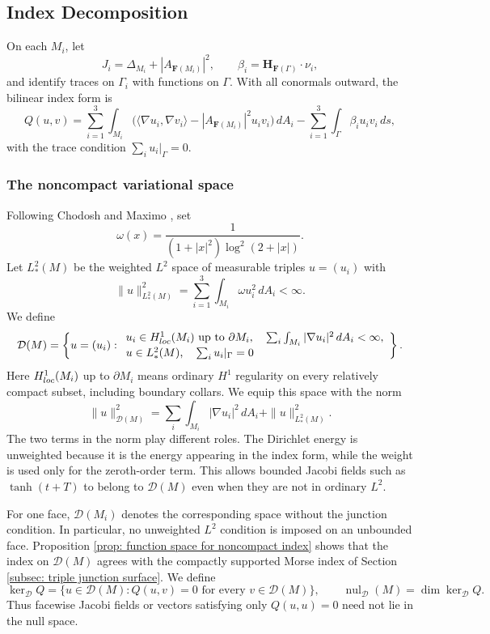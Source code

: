 \documentclass[11pt,twoside]{amsart}
\numberwithin{equation}{section}
\begin{document}
\subsection{Index Decomposition} \label{subsec: index decomp}
On each $M_i$, let
\[
J_i=\Delta_{M_i}+|A_{\mathbf F(M_i)}|^2,
\qquad
\beta_i=\mathbf H_{\mathbf F(\Gamma)}\cdot\nu_i,
\]
and identify traces on $\Gamma_i$ with functions on $\Gamma$. With all conormals outward, the bilinear index form is
\[
Q(u,v)=\sum_{i=1}^3\int_{M_i}
\bigl(\langle\nabla u_i,\nabla v_i\rangle-|A_{\mathbf F(M_i)}|^2u_iv_i\bigr)\,dA_i
-\sum_{i=1}^3\int_\Gamma\beta_i u_iv_i\,ds,
\]
with the trace condition $\sum_i u_i|_\Gamma=0$.

\subsubsection*{The noncompact variational space}
Following Chodosh and Maximo \cite[Section 3]{chodosh2018topology}, set
\[
\omega(x)=\frac{1}{(1+|x|^2)\log^2(2+|x|)}.
\]
Let $L_*^2(M)$ be the weighted $L^2$ space of measurable triples $u=(u_i)$ with
\[
\|u\|_{L_*^2(M)}^2=\sum_{i=1}^3\int_{M_i}\omega u_i^2\,dA_i<\infty.
\]
We define
\[
\mathcal D(M)=\left\{u=(u_i):
\begin{array}{l}
u_i\in H^1_{\rm loc}(M_i)\text{ up to }\partial M_i,\quad
\sum_i\int_{M_i}|\nabla u_i|^2\,dA_i<\infty,\\[2pt]
u\in L_*^2(M),\quad \sum_i u_i|_\Gamma=0
\end{array}\right\}.
\]
Here $H^1_{\rm loc}(M_i)$ up to $\partial M_i$ means ordinary $H^1$ regularity on every relatively compact subset, including boundary collars. We equip this space with the norm
\[
\|u\|_{\mathcal D(M)}^2
=\sum_i\int_{M_i}|\nabla u_i|^2\,dA_i+\|u\|_{L_*^2(M)}^2.
\]
The two terms in the norm play different roles. The Dirichlet energy is unweighted because it is the energy appearing in the index form, while the weight is used only for the zeroth-order term. This allows bounded Jacobi fields such as $\tanh(t+T)$ to belong to $\mathcal D(M)$ even when they are not in ordinary $L^2$.

For one face, $\mathcal D(M_i)$ denotes the corresponding space without the junction condition. In particular, no unweighted $L^2$ condition is imposed on an unbounded face. Proposition \ref{prop: function space for noncompact index} shows that the index on $\mathcal D(M)$ agrees with the compactly supported Morse index of Section \ref{subsec: triple junction surface}. We define
\[
\ker_{\mathcal D}Q=\{u\in\mathcal D(M):Q(u,v)=0\text{ for every }v\in\mathcal D(M)\},
\qquad
\operatorname{nul}_{\mathcal D}(M)=\dim\ker_{\mathcal D}Q.
\]
Thus facewise Jacobi fields or vectors satisfying only $Q(u,u)=0$ need not lie in the null space.
\end{document}
